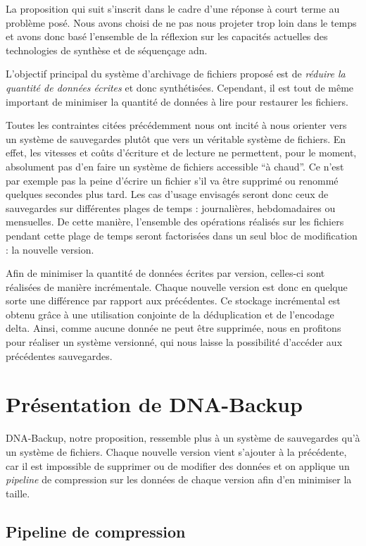 \documentclass[a4paper]{report}
\begin{document}
La proposition qui suit s'inscrit dans le cadre d'une réponse à court terme au problème posé.
Nous avons choisi de ne pas nous projeter trop loin dans le temps
et avons donc basé l'ensemble de la réflexion sur les capacités actuelles
des technologies de synthèse et de séquençage \ac{adn}.

L'objectif principal du système d'archivage de fichiers proposé
est de \emph{réduire la quantité de données écrites} et donc synthétisées.
Cependant, il est tout de même important de minimiser la quantité de données
à lire pour restaurer les fichiers.

Toutes les contraintes citées précédemment nous ont incité
à nous orienter vers un système de sauvegardes plutôt que vers un véritable système de fichiers.
En effet, les vitesses et coûts d'écriture et de lecture ne permettent, pour le moment,
absolument pas d'en faire un système de fichiers accessible ``à chaud''.
Ce n'est par exemple pas la peine d'écrire un fichier
s'il va être supprimé ou renommé quelques secondes plus tard.
Les cas d'usage envisagés seront donc ceux de sauvegardes sur différentes plages de temps :
journalières, hebdomadaires ou mensuelles.
De cette manière, l'ensemble des opérations réalisés sur les fichiers pendant cette plage de temps
seront factorisées dans un seul bloc de modification : la nouvelle version.


Afin de minimiser la quantité de données écrites par version, celles-ci sont réalisées de manière incrémentale.
Chaque nouvelle version est donc en quelque sorte une différence par rapport aux précédentes.
Ce stockage incrémental est obtenu grâce à une utilisation conjointe de la déduplication et de l'encodage delta.
Ainsi, comme aucune donnée ne peut être supprimée,
nous en profitons pour réaliser un système versionné,
qui nous laisse la possibilité d'accéder aux précédentes sauvegardes.


\chapter{Présentation de DNA-Backup}

DNA-Backup, notre proposition, ressemble plus à un système de sauvegardes qu'à un système de fichiers.
Chaque nouvelle version vient s'ajouter à la précédente, car il est impossible de supprimer ou de modifier des données
et on applique un \emph{pipeline} de compression sur les données de chaque version afin d'en minimiser la taille.

\section{Pipeline de compression}
\end{document}
